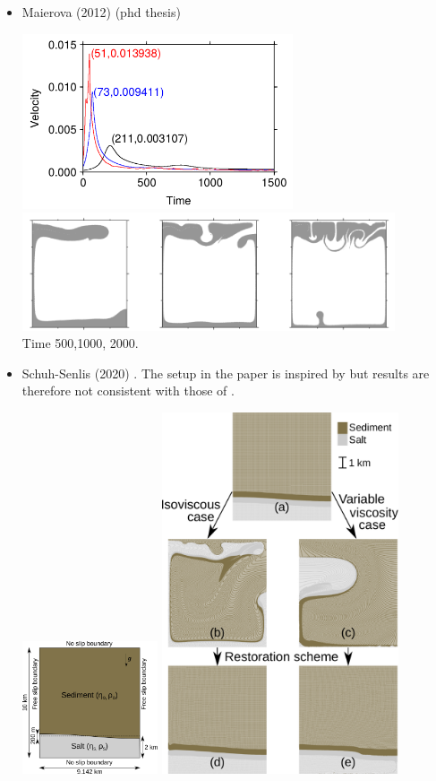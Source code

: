 \begin{itemize}
\item Maierova (2012) \cite{maie12} (phd thesis)

\begin{center}
\includegraphics[width=8cm]{images/benchmark_vaks97/maie12_b}
\includegraphics[width=11cm]{images/benchmark_vaks97/maie12_a}\\
{\captionfont Time 500,1000, 2000.}
\end{center}


\item Schuh-Senlis \etal (2020) \cite{sctc20}. The setup in the paper is inspired 
by \cite{vaks97} but results are therefore not consistent with those of \cite{vaks97}.

\begin{center}
\includegraphics[width=4cm]{images/benchmark_vaks97/schuh_senlis_etal/fig04}
\includegraphics[width=7cm]{images/benchmark_vaks97/schuh_senlis_etal/fig05}
\end{center}


\end{itemize}
